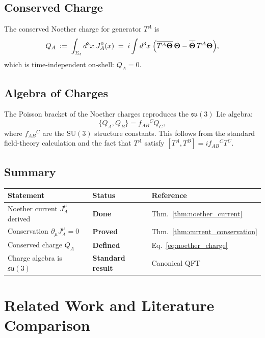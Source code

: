 \documentclass[12pt,a4paper]{article}
\theoremstyle{remark}
\begin{document}
\subsection{Conserved Charge}

The conserved Noether charge for generator $T^A$ is
\begin{equation}
  \label{eq:noether_charge}
  Q_A \;:=\; \int_{\Sigma_t} d^3x\; J_A^0(x)
  \;=\; i\int d^3x\;
    \Bigl(
      \overline{T^A\boldsymbol{\Theta}}\,\dot{\boldsymbol{\Theta}}
      - \overline{\dot{\boldsymbol{\Theta}}}\,T^A\boldsymbol{\Theta}
    \Bigr),
\end{equation}
which is time-independent on-shell: $\dot Q_A = 0$.

\subsection{Algebra of Charges}

The Poisson bracket of the Noether charges reproduces the $\mathfrak{su}(3)$
Lie algebra:
\begin{equation}
  \{Q_A, Q_B\} = f_{AB}{}^C Q_C,
\end{equation}
where $f_{AB}{}^C$ are the $\mathrm{SU}(3)$ structure constants.  This follows
from the standard field-theory calculation and the fact that $T^A$ satisfy
$[T^A,T^B]=if_{AB}{}^C T^C$.

\subsection{Summary}

\begin{center}
\begin{tabular}{lll}
  \hline
  Statement & Status & Reference \\
  \hline
  Noether current $J_A^\mu$ derived & \textbf{Done} & Thm.~\ref{thm:noether_current} \\
  Conservation $\partial_\mu J_A^\mu=0$ & \textbf{Proved} & Thm.~\ref{thm:current_conservation} \\
  Conserved charge $Q_A$ & \textbf{Defined} & Eq.~\eqref{eq:noether_charge} \\
  Charge algebra is $\mathfrak{su}(3)$ & \textbf{Standard result} & Canonical QFT \\
  \hline
\end{tabular}
\end{center}

\section{Related Work and Literature Comparison}
\label{sec:related}
\end{document}
